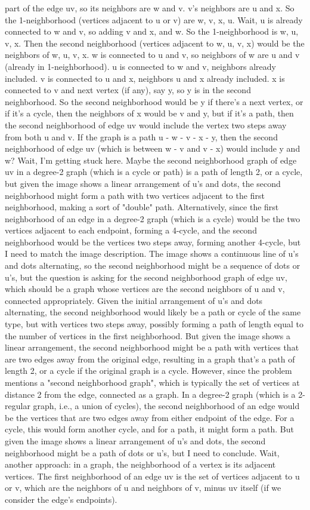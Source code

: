 {part of the edge uv, so its neighbors are w and v. v's neighbors are u and x. So the 1-neighborhood (vertices adjacent to u or v) are w, v, x, u. Wait, u is already connected to w and v, so adding v and x, and w. So the 1-neighborhood is {w, u, v, x}. Then the second neighborhood (vertices adjacent to w, u, v, x) would be the neighbors of w, u, v, x. w is connected to u and v, so neighbors of w are u and v (already in 1-neighborhood). u is connected to w and v, neighbors already included. v is connected to u and x, neighbors u and x already included. x is connected to v and next vertex (if any), say y, so y is in the second neighborhood. So the second neighborhood would be {y} if there's a next vertex, or if it's a cycle, then the neighbors of x would be v and y, but if it's a path, then the second neighborhood of edge uv would include the vertex two steps away from both u and v. If the graph is a path u - w - v - x - y, then the second neighborhood of edge uv (which is between w - v and v - x) would include y and w? Wait, I'm getting stuck here. Maybe the second neighborhood graph of edge uv in a degree-2 graph (which is a cycle or path) is a path of length 2, or a cycle, but given the image shows a linear arrangement of u's and dots, the second neighborhood might form a path with two vertices adjacent to the first neighborhood, making a sort of "double" path. Alternatively, since the first neighborhood of an edge in a degree-2 graph (which is a cycle) would be the two vertices adjacent to each endpoint, forming a 4-cycle, and the second neighborhood would be the vertices two steps away, forming another 4-cycle, but I need to match the image description. The image shows a continuous line of u's and dots alternating, so the second neighborhood might be a sequence of dots or u's, but the question is asking for the second neighborhood graph of edge uv, which should be a graph whose vertices are the second neighbors of u and v, connected appropriately. Given the initial arrangement of u's and dots alternating, the second neighborhood would likely be a path or cycle of the same type, but with vertices two steps away, possibly forming a path of length equal to the number of vertices in the first neighborhood. But given the image shows a linear arrangement, the second neighborhood might be a path with vertices that are two edges away from the original edge, resulting in a graph that's a path of length 2, or a cycle if the original graph is a cycle. However, since the problem mentions a "second neighborhood graph", which is typically the set of vertices at distance 2 from the edge, connected as a graph. In a degree-2 graph (which is a 2-regular graph, i.e., a union of cycles), the second neighborhood of an edge would be the vertices that are two edges away from either endpoint of the edge. For a cycle, this would form another cycle, and for a path, it might form a path. But given the image shows a linear arrangement of u's and dots, the second neighborhood might be a path of dots or u's, but I need to conclude. Wait, another approach: in a graph, the neighborhood of a vertex is its adjacent vertices. The first neighborhood of an edge uv is the set of vertices adjacent to u or v, which are the neighbors of u and neighbors of v, minus uv itself (if we consider the edge's endpoints). }
